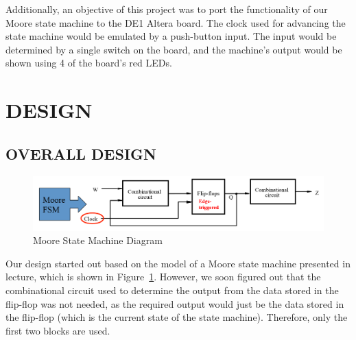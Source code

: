 \documentclass[paper=a4, fontsize=11pt,twoside]{scrartcl}
\begin{document}
Additionally, an objective of this project was to port the functionality of our Moore state machine to the DE1 Altera board. The clock used for advancing the state machine would be emulated by a push-button input. The input would be determined by a single switch on the board, and the machine's output would be shown using 4 of the board's red LEDs.

\section{DESIGN} %
\label{sec:design}
	\subsection{OVERALL DESIGN} %
	\label{sub:overall_design}
	\begin{figure}[h]
		\centering
		\includegraphics[scale=0.7]{MooreSM.PNG}
		\caption{Moore State Machine Diagram}
		\label{fig:MSM}
	\end{figure}

	Our design started out based on the model of a Moore state machine presented in lecture, which is shown in Figure~\ref{fig:MSM}. However, we soon figured out that the combinational circuit used to determine the output from the data stored in the flip-flop was not needed, as the required output would just be the data stored in the flip-flop (which is the current state of the state machine). Therefore, only the first two blocks are used.
\end{document}
